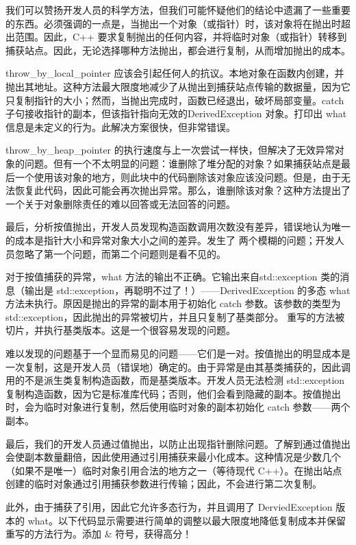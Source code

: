 
我们可以赞扬开发人员的科学方法，但我们可能怀疑他们的结论中遗漏了一些重要的东西。必须强调的一点是，当抛出一个对象（或指针）时，该对象将在抛出时超出范围。因此，C++ 要求复制抛出的任何内容，并将临时对象（或指针）转移到捕获站点。因此，无论选择哪种方法抛出，都会进行复制，从而增加抛出的成本。

throw\_by\_local\_pointer 应该会引起任何人的抗议。本地对象在函数内创建，并抛出其地址。这种方法最大限度地减少了从抛出到捕获站点传输的数据量，因为它只复制指针的大小；然而，当抛出完成时，函数已经退出，破坏局部变量。catch 子句接收指针的副本，但该指针指向无效的DerivedException 对象。打印出 what 信息是未定义的行为。此解决方案很快，但非常错误。

throw\_by\_heap\_pointer 的执行速度与上一次尝试一样快，但解决了无效异常对象的问题。但有一个不太明显的问题：谁删除了堆分配的对象？如果捕获站点是最后一个使用该对象的地方，则此块中的代码删除该对象应该没问题。但是，由于无法恢复此代码，因此可能会再次抛出异常。那么，谁删除该对象？这种方法提出了一个关于对象删除责任的难以回答或无法回答的问题。

最后，分析按值抛出，开发人员发现构造函数调用次数没有差异，错误地认为唯一的成本是指针大小和异常对象大小之间的差异。发生了 两个模糊的问题；开发人员忽略了第一个问题，而第二个问题则是看不见的。

对于按值捕获的异常，what 方法的输出不正确。它输出来自std::exception 类的消息（输出是 std::exception，再聪明不过了！）——DerivedException 的多态 what 方法未执行。原因是抛出的异常的副本用于初始化 catch 参数。该参数的类型为std::exception，因此抛出的异常被切片，并且只复制了基类部分。
重写的方法被切片，并执行基类版本。这是一个很容易发现的问题。

难以发现的问题基于一个显而易见的问题——它们是一对。按值抛出的明显成本是一次复制，这是开发人员（错误地）确定的。由于异常是由其基类捕获的，因此调用的不是派生类复制构造函数，而是基类版本。开发人员无法检测 std::exception 复制构造函数，因为它是标准库代码；否则，他们会看到隐藏的副本。按值抛出时，会为临时对象进行复制，然后使用临时对象的副本初始化 catch 参数——两个副本。


最后，我们的开发人员通过值抛出，以防止出现指针删除问题。了解到通过值抛出会使副本数量翻倍，因此使用通过引用捕获来最小化成本。这种情况是少数几个（如果不是唯一）临时对象引用合法的地方之一（等待现代 C++）。在抛出站点创建的临时对象通过引用捕获参数进行传输；因此，不会进行第二次复制。

此外，由于捕获了引用，因此它允许多态行为，并且调用了 DerviedException 版本的 what。以下代码显示需要进行简单的调整以最大限度地降低复制成本并保留重写的方法行为。添加 \& 符号，获得高分！

